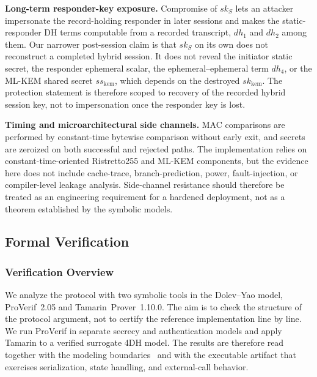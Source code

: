 \documentclass[preprint,12pt]{elsarticle}
\theoremstyle{remark}
\begin{document}
\textbf{Long-term responder-key exposure.} Compromise of $sk_S$ lets an attacker impersonate the record-holding responder in later sessions and makes the static-responder DH terms computable from a recorded transcript, $dh_1$ and $dh_2$ among them. Our narrower post-session claim is that $sk_S$ on its own does not reconstruct a completed hybrid session. It does not reveal the initiator static secret, the responder ephemeral scalar, the ephemeral--ephemeral term $dh_4$, or the ML-KEM shared secret $ss_{\mathrm{kem}}$, which depends on the destroyed $sk_{\mathrm{kem}}$. The protection statement is therefore scoped to recovery of the recorded hybrid session key, not to impersonation once the responder key is lost.

\textbf{Timing and microarchitectural side channels.} MAC comparisons
are performed by constant-time bytewise comparison without early exit,
and secrets are zeroized on both successful and rejected paths. The
implementation relies on constant-time-oriented Ristretto255 and ML-KEM
components, but the evidence here does not include cache-trace,
branch-prediction, power, fault-injection, or compiler-level leakage
analysis. Side-channel resistance should therefore be treated as an
engineering requirement for a hardened deployment, not as a theorem
established by the symbolic models.

\subsection{Formal Verification}

\subsubsection{Verification Overview}

We analyze the protocol with two symbolic tools in the Dolev--Yao model, ProVerif~2.05 and Tamarin~Prover~1.10.0. The aim is to check the structure of the protocol argument, not to certify the reference implementation line by line. We run ProVerif in separate secrecy and authentication models and apply Tamarin to a verified surrogate 4DH model. The results are therefore read together with the modeling boundaries~\cite{cremers2012,basin2018} and with the executable artifact that exercises serialization, state handling, and external-call behavior.
\end{document}
